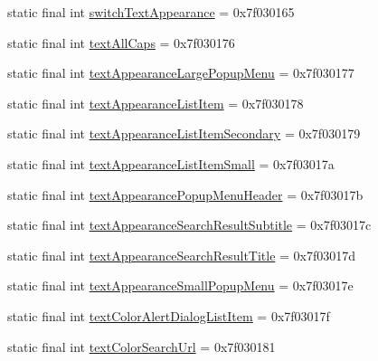 \begin{DoxyCompactItemize}
\item 
static final int \mbox{\hyperlink{classandroid_1_1support_1_1v7_1_1appcompat_1_1_r_1_1attr_af5a40cefa1117378a67f11a74d605a6b}{switch\+Text\+Appearance}} = 0x7f030165
\item 
static final int \mbox{\hyperlink{classandroid_1_1support_1_1v7_1_1appcompat_1_1_r_1_1attr_a4a60809d06170629404a0a766aad785e}{text\+All\+Caps}} = 0x7f030176
\item 
static final int \mbox{\hyperlink{classandroid_1_1support_1_1v7_1_1appcompat_1_1_r_1_1attr_a74709df50c1106d494db194f4d3b6c0c}{text\+Appearance\+Large\+Popup\+Menu}} = 0x7f030177
\item 
static final int \mbox{\hyperlink{classandroid_1_1support_1_1v7_1_1appcompat_1_1_r_1_1attr_ad63a659a75f2e87efb7d90fec4edd4b5}{text\+Appearance\+List\+Item}} = 0x7f030178
\item 
static final int \mbox{\hyperlink{classandroid_1_1support_1_1v7_1_1appcompat_1_1_r_1_1attr_a8cbdd00a7bc7545250850d3d6a00f18e}{text\+Appearance\+List\+Item\+Secondary}} = 0x7f030179
\item 
static final int \mbox{\hyperlink{classandroid_1_1support_1_1v7_1_1appcompat_1_1_r_1_1attr_abda379e68781ab8c707c66b040ac9a62}{text\+Appearance\+List\+Item\+Small}} = 0x7f03017a
\item 
static final int \mbox{\hyperlink{classandroid_1_1support_1_1v7_1_1appcompat_1_1_r_1_1attr_ae58c369de116e689fb7c5f730d34bcf5}{text\+Appearance\+Popup\+Menu\+Header}} = 0x7f03017b
\item 
static final int \mbox{\hyperlink{classandroid_1_1support_1_1v7_1_1appcompat_1_1_r_1_1attr_a2651df0f5401849b71cff71b656297fe}{text\+Appearance\+Search\+Result\+Subtitle}} = 0x7f03017c
\item 
static final int \mbox{\hyperlink{classandroid_1_1support_1_1v7_1_1appcompat_1_1_r_1_1attr_a910447f9a3116783170bf3da8baf3666}{text\+Appearance\+Search\+Result\+Title}} = 0x7f03017d
\item 
static final int \mbox{\hyperlink{classandroid_1_1support_1_1v7_1_1appcompat_1_1_r_1_1attr_aad4315d4193f9362eaea2020b29b265a}{text\+Appearance\+Small\+Popup\+Menu}} = 0x7f03017e
\item 
static final int \mbox{\hyperlink{classandroid_1_1support_1_1v7_1_1appcompat_1_1_r_1_1attr_a8fac1b5ad37c5960fe92a3fa9c5ad14d}{text\+Color\+Alert\+Dialog\+List\+Item}} = 0x7f03017f
\item 
static final int \mbox{\hyperlink{classandroid_1_1support_1_1v7_1_1appcompat_1_1_r_1_1attr_a90c011a6893d57e7ac36d2f522dac1ac}{text\+Color\+Search\+Url}} = 0x7f030181

\end{DoxyCompactItemize}
